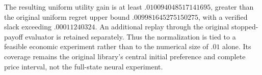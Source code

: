 The resulting uniform utility gain is at least $.010094048517141695$, greater than the original uniform regret upper bound $.009981645275150275$, with a verified slack exceeding $.00011240324$. An additional replay through the original stopped-payoff evaluator is retained separately. Thus the normalization is tied to a feasible economic experiment rather than to the numerical size of $.01$ alone. Its coverage remains the original library's central initial preference and complete price interval, not the full-state neural experiment.
